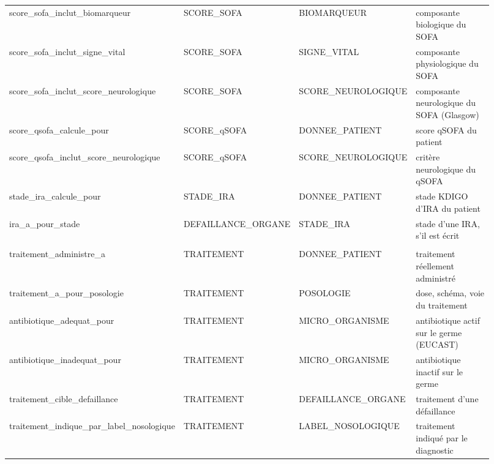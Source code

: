 \begin{longtable}{>{\raggedright\arraybackslash}p{0.30\linewidth}>{\raggedright\arraybackslash}p{0.20\linewidth}>{\raggedright\arraybackslash}p{0.20\linewidth}>{\raggedright\arraybackslash}p{0.22\linewidth}}
score\_\allowbreak{}sofa\_\allowbreak{}inclut\_\allowbreak{}biomarqueur & SCORE\_\allowbreak{}SOFA & BIOMARQUEUR & composante biologique du SOFA \\
score\_\allowbreak{}sofa\_\allowbreak{}inclut\_\allowbreak{}signe\_\allowbreak{}vital & SCORE\_\allowbreak{}SOFA & SIGNE\_\allowbreak{}VITAL & composante physiologique du SOFA \\
score\_\allowbreak{}sofa\_\allowbreak{}inclut\_\allowbreak{}score\_\allowbreak{}neurologique & SCORE\_\allowbreak{}SOFA & SCORE\_\allowbreak{}NEUROLOGIQUE & composante neurologique du SOFA (Glasgow) \\
score\_\allowbreak{}qsofa\_\allowbreak{}calcule\_\allowbreak{}pour & SCORE\_\allowbreak{}qSOFA & DONNEE\_\allowbreak{}PATIENT & score qSOFA du patient \\
score\_\allowbreak{}qsofa\_\allowbreak{}inclut\_\allowbreak{}score\_\allowbreak{}neurologique & SCORE\_\allowbreak{}qSOFA & SCORE\_\allowbreak{}NEUROLOGIQUE & critère neurologique du qSOFA \\
stade\_\allowbreak{}ira\_\allowbreak{}calcule\_\allowbreak{}pour & STADE\_\allowbreak{}IRA & DONNEE\_\allowbreak{}PATIENT & stade KDIGO d'IRA du patient \\
ira\_\allowbreak{}a\_\allowbreak{}pour\_\allowbreak{}stade & DEFAILLANCE\_\allowbreak{}ORGANE & STADE\_\allowbreak{}IRA & stade d'une IRA, s'il est écrit \\
\addlinespace
\multicolumn{4}{l}{\textbf{Relations thérapeutiques (6)}}\\
traitement\_\allowbreak{}administre\_\allowbreak{}a & TRAITEMENT & DONNEE\_\allowbreak{}PATIENT & traitement réellement administré \\
traitement\_\allowbreak{}a\_\allowbreak{}pour\_\allowbreak{}posologie & TRAITEMENT & POSOLOGIE & dose, schéma, voie du traitement \\
antibiotique\_\allowbreak{}adequat\_\allowbreak{}pour & TRAITEMENT & MICRO\_\allowbreak{}ORGANISME & antibiotique actif sur le germe (EUCAST) \\
antibiotique\_\allowbreak{}inadequat\_\allowbreak{}pour & TRAITEMENT & MICRO\_\allowbreak{}ORGANISME & antibiotique inactif sur le germe \\
traitement\_\allowbreak{}cible\_\allowbreak{}defaillance & TRAITEMENT & DEFAILLANCE\_\allowbreak{}ORGANE & traitement d'une défaillance \\
traitement\_\allowbreak{}indique\_\allowbreak{}par\_\allowbreak{}label\_\allowbreak{}nosologique & TRAITEMENT & LABEL\_\allowbreak{}NOSOLOGIQUE & traitement indiqué par le diagnostic \\

\end{longtable}
